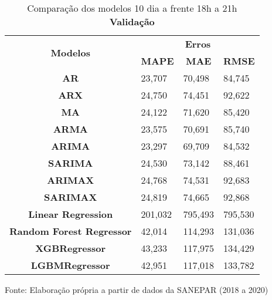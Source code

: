 \begin{table}[H]
	\centering
	\caption{Comparação dos modelos 10 dia a frente 18h a 21h \textbf{Validação} }\label{tb:10-18vld}
	\begin{tabular}{@{}clll@{}}
		\toprule
		\multirow{2}{*}{\textbf{Modelos}} & \multicolumn{3}{c}{\textbf{Erros}}                                                                       \\ \cmidrule(l){2-4} 
		& \multicolumn{1}{c}{\textbf{MAPE}} & \multicolumn{1}{c}{\textbf{MAE}} & \multicolumn{1}{c}{\textbf{RMSE}} \\ \hline
\textbf{AR}                       & 23,707                            & 70,498                           & 84,745                            \\
\textbf{ARX}                      & 24,750                            & 74,451                           & 92,622                            \\
\textbf{MA}                       & 24,122                            & 71,620                           & 85,420                            \\
\textbf{ARMA}                     & 23,575                            & 70,691                           & 85,740                            \\
\textbf{ARIMA}                    & 23,297                            & 69,709                           & 84,532                            \\
\textbf{SARIMA}                   & 24,530                            & 73,142                           & 88,461                            \\
\textbf{ARIMAX}                   & 24,768                            & 74,531                           & 92,683                            \\
\textbf{SARIMAX}                  & 24,819                            & 74,665                           & 92,868                            \\
\textbf{Linear Regression}        & 201,032                           & 795,493                          & 795,530                           \\
\textbf{Random Forest Regressor}  & 42,014                            & 114,293                          & 131,036                           \\
\textbf{XGBRegressor}             & 43,233                            & 117,975                          & 134,429                           \\
\textbf{LGBMRegressor}            & 42,951                            & 117,018                          & 133,782                           \\ \bottomrule
	\end{tabular}

Fonte: Elaboração própria a partir de dados da SANEPAR (2018 a 2020)
\end{table}

